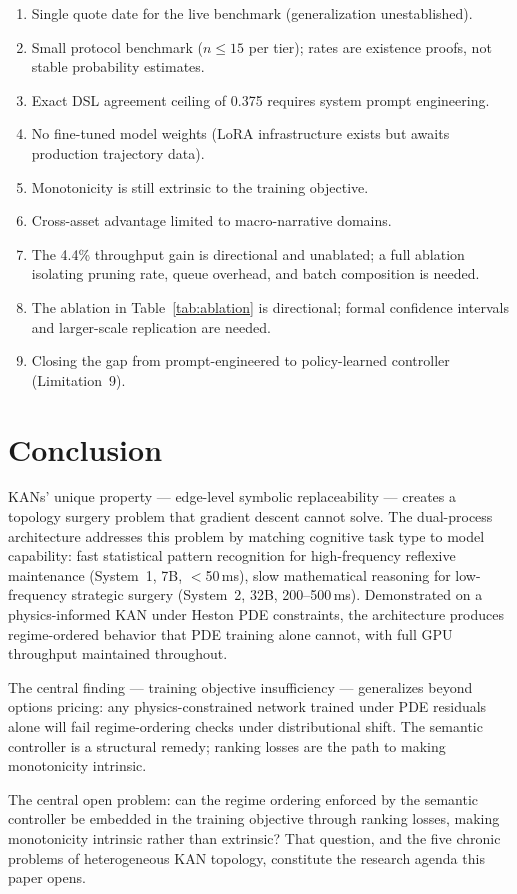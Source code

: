 \documentclass[11pt,a4paper]{article}
\begin{document}
\begin{enumerate}
  \item Single quote date for the live benchmark (generalization unestablished).
  \item Small protocol benchmark ($n \leq 15$ per tier); rates are existence proofs,
  not stable probability estimates.
  \item Exact DSL agreement ceiling of 0.375 requires system prompt engineering.
  \item No fine-tuned model weights (LoRA infrastructure exists but awaits production
  trajectory data).
  \item Monotonicity is still extrinsic to the training objective.
  \item Cross-asset advantage limited to macro-narrative domains.
  \item The 4.4\% throughput gain is directional and unablated; a full ablation
  isolating pruning rate, queue overhead, and batch composition is needed.
  \item The ablation in Table~\ref{tab:ablation} is directional; formal confidence
  intervals and larger-scale replication are needed.
  \item Closing the gap from prompt-engineered to policy-learned controller (Limitation~9).
\end{enumerate}

\section{Conclusion}
\label{sec:conclusion}

KANs' unique property --- edge-level symbolic replaceability --- creates a topology
surgery problem that gradient descent cannot solve. The dual-process architecture
addresses this problem by matching cognitive task type to model capability: fast
statistical pattern recognition for high-frequency reflexive maintenance (System~1,
7B, $<$50\,ms), slow mathematical reasoning for low-frequency strategic surgery
(System~2, 32B, 200--500\,ms). Demonstrated on a physics-informed KAN under Heston
PDE constraints, the architecture produces regime-ordered behavior that PDE training
alone cannot, with full GPU throughput maintained throughout.

The central finding --- training objective insufficiency --- generalizes beyond options
pricing: any physics-constrained network trained under PDE residuals alone will fail
regime-ordering checks under distributional shift. The semantic controller is a
structural remedy; ranking losses are the path to making monotonicity intrinsic.

The central open problem: can the regime ordering enforced by the semantic controller
be embedded in the training objective through ranking losses, making monotonicity
intrinsic rather than extrinsic? That question, and the five chronic problems of
heterogeneous KAN topology, constitute the research agenda this paper opens.



\end{document}
